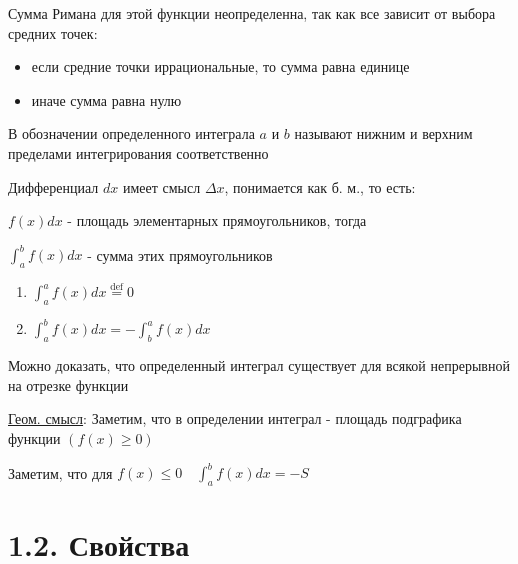 \documentclass[12pt]{article}
\begin{document}
    Сумма Римана для этой функции неопределенна, так как все зависит от выбора средних точек:
    \begin{itemize}
        \item если средние точки иррациональные, то сумма равна единице
        \item иначе сумма равна нулю
    \end{itemize}

    В обозначении определенного интеграла $a$ и $b$ называют нижним и верхним пределами интегрирования соответственно

    Дифференциал $dx$ имеет смысл $\Delta x$, понимается как б. м., то есть:

    $f(x) dx$ - площадь элементарных прямоугольников, тогда

    $\int^b_a f(x) dx$ - сумма этих прямоугольников

    \vspace{5mm}

    \begin{enumerate}
        \item $\int_a^a f(x)dx \stackrel{\text{def}}{=} 0$
        \item $\int_a^b f(x)dx = -\int_b^a f(x)dx$
    \end{enumerate}

    Можно доказать, что определенный интеграл существует для всякой непрерывной на отрезке функции

    \underline{Геом. смысл}: \hypertarget{integralgeommeaning}{Заметим, что в определении интеграл} - площадь подграфика функции $(f(x) \geq 0)$

    Заметим, что для $f(x) \leq 0 \quad \int_a^b f(x)dx = -S$


    \section{1.2. Свойства}
    \hypertarget{integralproperties}{}
\end{document}
